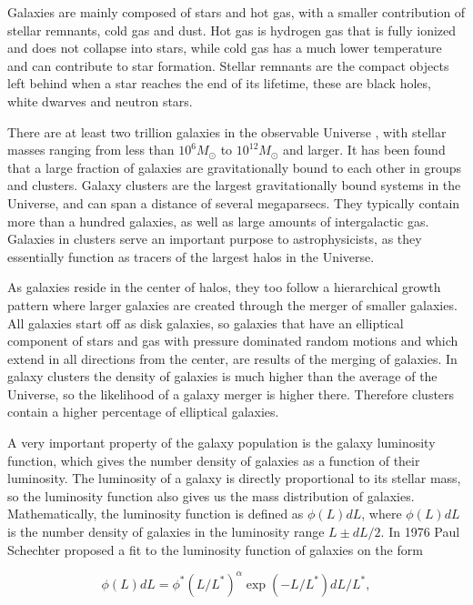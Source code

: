 Galaxies are mainly composed of stars and hot gas, with a smaller contribution of stellar remnants, cold gas and dust. Hot gas is hydrogen gas that is fully ionized and does not collapse into stars, while cold gas has a much lower temperature and can contribute to star formation. Stellar remnants are the compact objects left behind when a star reaches the end of its lifetime, these are black holes, white dwarves and neutron stars.

There are at least two trillion galaxies in the observable Universe \parencite{Conselice2016}, with stellar masses ranging from less than $10^6 M_{\odot}$ to $10^{12} M_{\odot}$ and larger. It has been found that a large fraction of galaxies are gravitationally bound to each other in groups and clusters. Galaxy clusters are the largest gravitationally bound systems in the Universe, and can span a distance of several megaparsecs. They typically contain more than a hundred galaxies, as well as large amounts of intergalactic gas. Galaxies in clusters serve an important purpose to astrophysicists, as they essentially function as tracers of the largest halos in the Universe.

As galaxies reside in the center of halos, they too follow a hierarchical growth pattern where larger galaxies are created through the merger of smaller galaxies. All galaxies start off as disk galaxies, so galaxies that have an elliptical component of stars and gas with pressure dominated random motions and which extend in all directions from the center, are results of the merging of galaxies. In galaxy clusters the density of galaxies is much higher than the average of the Universe, so the likelihood of a galaxy merger is higher there. Therefore clusters contain a higher percentage of elliptical galaxies.

A very important property of the galaxy population is the galaxy luminosity function, which gives the number density of galaxies as a function of their luminosity. The luminosity of a galaxy is directly proportional to its stellar mass, so the luminosity function also gives us the mass distribution of galaxies. Mathematically, the luminosity function is defined as $\phi(L)dL$, where $\phi(L)dL$ is the number density of galaxies in the luminosity range $L \pm dL/2$. In 1976 Paul Schechter proposed a fit to the luminosity function of galaxies on the form

\begin{equation} \label{lum_func}
    \phi(L)dL = \phi^*(L/L^*)^{\alpha}\exp{(-L/L^*)}dL/L^*,
\end{equation}

